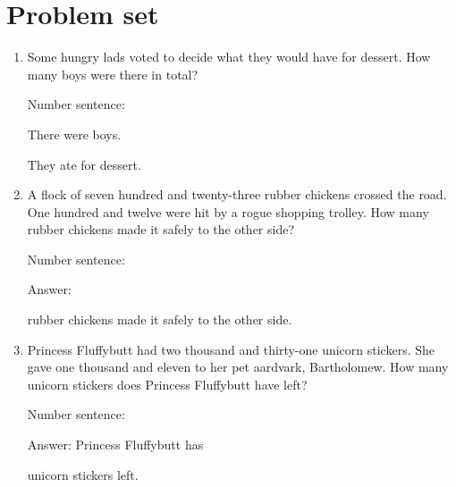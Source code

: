 \documentclass{tufte-book}
\begin{document}
\clearpage\section{Problem set }

\begin{enumerate}
\item {}
Some hungry lads voted to decide what they would have for dessert.
How many boys were there in total? \medskip

Number sentence: \dotfill\medskip\par
There were \dotfill\medskip boys.

They ate \dotfill\medskip for dessert.

\item A flock of seven hundred and twenty-three rubber chickens crossed the road. One hundred and twelve were hit by a rogue shopping trolley. How many rubber chickens made it safely to the other side?\medskip

\medskip Number sentence: \dotfill\medskip

Answer: \dotfill\medskip\par\mbox{}\dotfill\medskip\par\mbox{}\dotfill\bigskip
rubber chickens made it safely to the other side.

\item Princess Fluffybutt had two thousand and thirty-one unicorn stickers. She gave one thousand and eleven to her pet aardvark, Bartholomew. How many unicorn stickers does Princess Fluffybutt have left?

\medskip Number sentence: \dotfill\medskip

Answer: Princess Fluffybutt has
\dotfill\medskip\par\mbox{}\dotfill\medskip\par\mbox{}\dotfill\bigskip
unicorn stickers left.


\end{enumerate}
\end{document}
